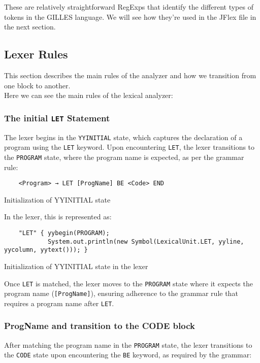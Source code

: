 	These are relatively straightforward RegExps that identify the different types of tokens in the GILLES language. We will see how they're used in the JFlex file in the next section.\\

	\subsection{Lexer Rules}
	This section describes the main rules of the analyzer and how we transition from one block to another.\\

	Here we can see the main rules of the lexical analyzer:

	\subsubsection{The initial \texttt{LET} Statement}
	The lexer begins in the \texttt{YYINITIAL} state, which captures the declaration of a program using the \texttt{LET} keyword. Upon encountering \texttt{LET}, the lexer transitions to the \texttt{PROGRAM} state, where the program name is expected, as per the grammar rule:

    \begin{verbatim}
	<Program> → LET [ProgName] BE <Code> END
	\end{verbatim}
    \begin{table}[h]
		\centering
		\caption{Initialization of YYINITIAL state}
	\end{table}

	In the lexer, this is represented as:

    \begin{verbatim}
	"LET" { yybegin(PROGRAM);
			System.out.println(new Symbol(LexicalUnit.LET, yyline, yycolumn, yytext())); }
	\end{verbatim}
    \begin{table}[h]
		\centering
		\caption{Initialization of YYINITIAL state in the lexer}
	\end{table}

	Once \texttt{LET} is matched, the lexer moves to the \texttt{PROGRAM} state where it expects the program name (\texttt{[ProgName]}), ensuring adherence to the grammar rule that requires a program name after \texttt{LET}.

	\subsubsection{ProgName and transition to the CODE block}
	After matching the program name in the \texttt{PROGRAM} state, the lexer transitions to the \texttt{CODE} state upon encountering the \texttt{BE} keyword, as required by the grammar:

